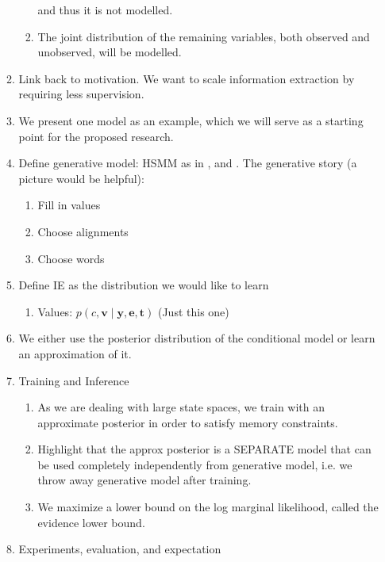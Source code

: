 \documentclass[12pt]{article}
\newcommand{\be}{\mathbf{e}}
\newcommand{\br}{\mathbf{r}}
\newcommand{\bt}{\mathbf{t}}
\newcommand{\bv}{\mathbf{v}}
\newcommand{\by}{\mathbf{y}}
\begin{document}
\begin{enumerate}
\begin{enumerate}
\begin{enumerate}
            and thus it is not modelled.
        \item The joint distribution of the remaining variables,
            both observed and unobserved, will be modelled.
        \end{enumerate}
    \item Link back to motivation. We want to scale information extraction
        by requiring less supervision.
    \item We present one model as an example, which we will serve as
        a starting point for the proposed research.
    \item Define generative model: HSMM as in \citep{liang2009semalign},
        and \citep{wiseman2018template}.
        The generative story (a picture would be helpful):
        \begin{enumerate}
        \item Fill in values
        \item Choose alignments
        \item Choose words
        \end{enumerate}
    \item Define IE as the distribution we would like to learn
        \begin{enumerate}
        \item Values: $p(c,\bv\mid\by,\be,\bt)$ (Just this one)
        \end{enumerate}
    \item We either use the posterior distribution of the conditional model
        or learn an approximation of it.
    \item Training and Inference
        \begin{enumerate}
        \item As we are dealing with large state spaces,
            we train with an approximate posterior in order to satisfy memory constraints.
        \item Highlight that the approx posterior is a SEPARATE model
            that can be used completely independently from generative model,
            i.e. we throw away generative model after training.
        \item We maximize a lower bound on the log marginal likelihood,
            called the evidence lower bound.
        \end{enumerate}
    \item Experiments, evaluation, and expectation

\end{enumerate}
\end{enumerate}
\end{document}
